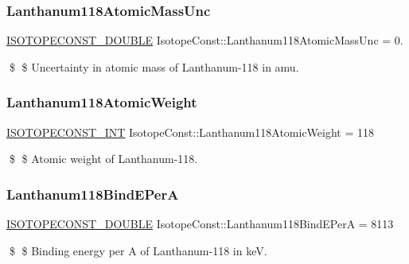 \subsubsection{\texorpdfstring{Lanthanum118\+Atomic\+Mass\+Unc}{Lanthanum118AtomicMassUnc}}
{\footnotesize\ttfamily \mbox{\hyperlink{group___isotope_const-_macros_ga8f45a7272ce02c0b4c65c44636ed719a}{I\+S\+O\+T\+O\+P\+E\+C\+O\+N\+S\+T\+\_\+\+D\+O\+U\+B\+LE}} Isotope\+Const\+::\+Lanthanum118\+Atomic\+Mass\+Unc = 0.}

\$ \$ Uncertainty in atomic mass of Lanthanum-\/118 in amu. \mbox{\label{group___isotope_const-_lanthanum-_la118_ga492ccd0c6fdc8f6a08fa67329eb02585}} 
\subsubsection{\texorpdfstring{Lanthanum118\+Atomic\+Weight}{Lanthanum118AtomicWeight}}
{\footnotesize\ttfamily \mbox{\hyperlink{group___isotope_const-_macros_ga5f18360b3e99483a35c32d789e62621c}{I\+S\+O\+T\+O\+P\+E\+C\+O\+N\+S\+T\+\_\+\+I\+NT}} Isotope\+Const\+::\+Lanthanum118\+Atomic\+Weight = 118}

\$ \$ Atomic weight of Lanthanum-\/118. \mbox{\label{group___isotope_const-_lanthanum-_la118_ga7b68395b0e461056b2f285a9fabc8328}} 
\subsubsection{\texorpdfstring{Lanthanum118\+Bind\+E\+PerA}{Lanthanum118BindEPerA}}
{\footnotesize\ttfamily \mbox{\hyperlink{group___isotope_const-_macros_ga8f45a7272ce02c0b4c65c44636ed719a}{I\+S\+O\+T\+O\+P\+E\+C\+O\+N\+S\+T\+\_\+\+D\+O\+U\+B\+LE}} Isotope\+Const\+::\+Lanthanum118\+Bind\+E\+PerA = 8113}

\$ \$ Binding energy per A of Lanthanum-\/118 in keV. \mbox{\label{group___isotope_const-_lanthanum-_la118_ga7a64fe8a43d00f7608b208be27892326}} 

